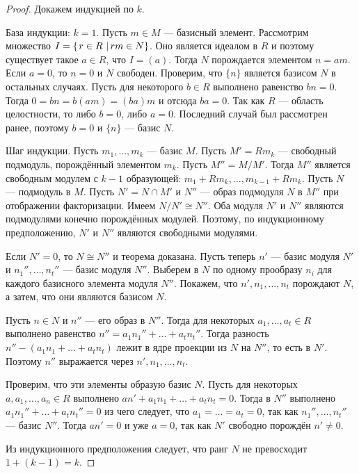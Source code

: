 \begin{proof}
	Докажем индукцией по $ k $.
	
	База индукции: $ k = 1 $.
	Пусть $ m \in M $ --- базисный элемент. Рассмотрим множество $ I = \left\{ \left. r \in R \ \right\vert rm \in N \right\} $.
	Оно является идеалом в $ R $ и поэтому существует такое $ a \in R $, что $ I = (a) $.
	Тогда $ N $ порождается элементом $ n = am $. Если $ a = 0 $, то $ n = 0 $ и $ N $ свободен.
	Проверим, что $ \{n\} $ является базисом $ N $ в остальных случаях.
	Пусть для некоторого $ b \in R $ выполнено равенство $ bn = 0 $. Тогда $ 0 = bn = b(am) = (ba)m $
	и отсюда $ ba = 0 $. Так как $ R $ --- область целостности, то либо $ b = 0 $, либо $ a = 0 $.
	Последний случай был рассмотрен ранее, поэтому $ b = 0 $ и $ \{n\} $ --- базис $ N $.
	
	Шаг индукции.
	Пусть $ m_1, \ldots, m_k $ --- базис $ M $.
	Пусть $ M' = Rm_k $ --- свободный подмодуль, порождённый элементом $ m_k $.
	Пусть $ M'' = M/M' $. Тогда $ M'' $ является свободным модулем с $ k - 1 $ образующей:
	$ m_1 + Rm_k, \ldots, m_{k - 1} + Rm_k $.
	Пусть $ N $ --- подмодуль в $ M $. 
	Пусть $ N' = N \cap M' $ и $ N'' $ --- образ подмодуля $ N $ в $ M'' $
	при отображении факторизации.
	Имеем $ N/N' \cong N'' $.
	Оба модуля $ N' $ и $ N'' $ являются подмодулями конечно порождённых модулей.
	Поэтому, по индукционному предположению, $ N' $ и $ N'' $ являются свободными модулями.
	
	Если $ N' = 0 $, то $ N \cong N'' $ и теорема доказана.
	Пусть теперь $ n' $ --- базис модуля $ N' $
	и $ n_1'', \ldots, n_t'' $ --- базис модуля $ N'' $.
	Выберем в $ N $ по одному прообразу $ n_i $ для каждого базисного элемента модуля $ N'' $.
	Покажем, что $ n', n_1, \ldots, n_t $ порождают $ N $, а затем, что они являются базисом $ N $.
	
	Пусть $ n \in N $ и $ n'' $ --- его образ в $ N'' $.
	Тогда для некоторых $ a_1, \ldots, a_t \in R $ выполнено равенство
	$ n'' = a_1n_1'' + \ldots + a_tn_t'' $.
	Тогда разность $ n'' - (a_1n_1 + \ldots + a_tn_t) $ лежит в ядре проекции из $ N $ на $ N'' $,
	то есть в $ N' $. Поэтому $ n'' $ выражается через $ n', n_1, \ldots, n_t $.
	
	Проверим, что эти элементы образую базис $ N $.
	Пусть для некоторых $ a, a_1, \ldots, a_n \in R $ 
	выполнено $ an' + a_1n_1 + \ldots + a_tn_t = 0 $.
	Тогда в $ N'' $ выполнено $ a_1n_1'' + \ldots + a_tn_t'' = 0 $
	из чего следует, что $ a_1 = \ldots = a_t = 0 $, так как $ n_1'', \ldots, n_t'' $ --- базис $ N'' $.
	Тогда $ an' = 0 $ и уже $ a = 0 $, так как $ N' $ свободно порождён $ n' \neq 0 $.
	
	Из индукционного предположения следует, что ранг $ N $ не превосходит $ 1 + (k - 1) = k $.
\end{proof}


